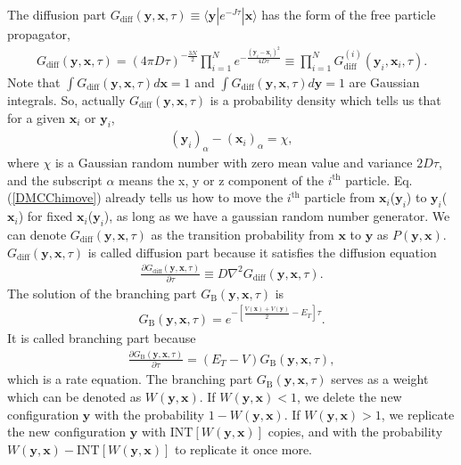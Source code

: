 \documentclass[12pt,letterpaper,UTF8]{report}
\begin{document}
{The diffusion part $G_{\textrm{diff}}(\bm{y},\bm{x},\tau) \equiv \langle \bm{y} |e^{-J \tau} | \bm{x} \rangle$ has the form of the free particle propagator,
\begin{eqnarray}
 G_{\textrm{diff}}(\bm{y},\bm{x},\tau) = (4\pi D \tau)^{-\frac{3N}{2}} \prod_{i=1}^N e^{- \frac{(\bm{y}_i - \bm{x}_i)^2}{4D\tau} }
 \equiv  \prod_{i=1}^N G^{(i)}_{\textrm{diff}}(\bm{y}_i,\bm{x}_i,\tau) .
 \end{eqnarray}
Note that
$\int {G}_{\textrm{diff}}(\bm{y},\bm{x},\tau) d\bm{x} = 1$ and
$\int {G}_{\textrm{diff}}(\bm{y},\bm{x},\tau) d\bm{y} = 1$
are Gaussian integrals.
So, actually ${G}_{\textrm{diff}}(\bm{y},\bm{x},\tau)$ is a probability density which tells us that for a given $\bm{x}_i$ or $\bm{y}_i$,
\begin{eqnarray}
(\bm{y}_i)_{\alpha} - (\bm{x}_i)_{\alpha} = \chi, \label{DMCChimove}
\end{eqnarray}
where $\chi$ is a Gaussian random number with zero mean value and variance $2D\tau$, and the subscript $\alpha$ means the x, y or z component of the $i^{\text{th}}$ particle.
Eq.(\ref{DMCChimove}) already tells us how to move the $i^{\text{th}}$ particle from $\bm{x}_i$($\bm{y}_i$) to $\bm{y}_i$($\bm{x}_i$) for fixed $\bm{x}_i$($\bm{y}_i$), as long as we have a gaussian random number generator. We can denote ${G}_{\textrm{diff}}(\bm{y},\bm{x},\tau)$ as the transition probability from $\bm{x}$ to $\bm{y}$ as $P(\bm{y},\bm{x})$. $ G_{\textrm{diff}}(\bm{y},\bm{x},\tau)$ is called diffusion part because it satisfies the diffusion equation
\begin{eqnarray}
\frac{\partial G_{\textrm{diff}}(\bm{y},\bm{x},\tau)}{\partial \tau} \equiv D \nabla^2 G_{\textrm{diff}}(\bm{y},\bm{x},\tau).
\end{eqnarray}
The solution of the branching part $G_{\textrm{B}}(\bm{y},\bm{x},\tau)$ is
\begin{eqnarray}
 G_{\textrm{B}}(\bm{y},\bm{x},\tau) = e^{ - \left[  \frac{ V(\bm{x}) + V(\bm{y})  }{2} - E_T \right] \tau  }.
\end{eqnarray}
It is called branching part because
\begin{eqnarray}
 \frac{\partial G_{\textrm{B}}(\bm{y},\bm{x},\tau)}{\partial \tau} = (E_T-V) G_{\textrm{B}}(\bm{y},\bm{x},\tau),
\end{eqnarray}
which is a rate equation. The branching part ${G}_{\textrm{B}}(\bm{y},\bm{x},\tau)$ serves as a weight which can be denoted as $W(\bm{y},\bm{x})$. If $W(\bm{y},\bm{x})<1$, we delete the new configuration $\bm{y}$ with the probability $1-W(\bm{y},\bm{x})$. If $W(\bm{y},\bm{x})>1$, we replicate the new configuration $\bm{y}$ with $\textrm{INT}[W(\bm{y},\bm{x})]$ copies, and with the probability $W(\bm{y},\bm{x})-\textrm{INT}[W(\bm{y},\bm{x})]$ to replicate it once more.

}
\end{document}
